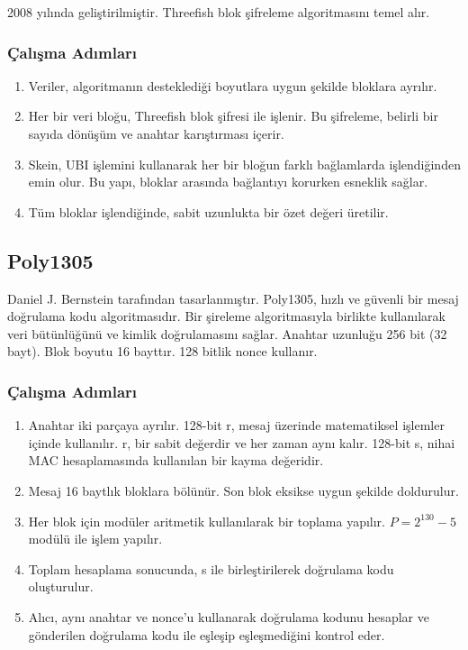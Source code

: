 2008 yılında geliştirilmiştir. Threefish blok şifreleme algoritmasını temel alır.

\subsubsection{Çalışma Adımları}

\begin{enumerate}
    \item Veriler, algoritmanın desteklediği boyutlara uygun şekilde bloklara ayrılır.
    \item Her bir veri bloğu, Threefish blok şifresi ile işlenir. Bu şifreleme, belirli bir sayıda dönüşüm ve anahtar karıştırması içerir.
    \item Skein, UBI işlemini kullanarak her bir bloğun farklı bağlamlarda işlendiğinden emin olur. Bu yapı, bloklar arasında bağlantıyı korurken esneklik sağlar.
    \item Tüm bloklar işlendiğinde, sabit uzunlukta bir özet değeri üretilir.
\end{enumerate}

\newpage

\subsection{Poly1305}

Daniel J. Bernstein tarafından tasarlanmıştır. Poly1305, hızlı ve güvenli bir mesaj doğrulama kodu algoritmasıdır. Bir şireleme algoritmasıyla birlikte kullanılarak veri bütünlüğünü ve kimlik doğrulamasını sağlar. Anahtar uzunluğu 256 bit (32 bayt). Blok boyutu 16 bayttır. 128 bitlik nonce kullanır.

\subsubsection{Çalışma Adımları}

\begin{enumerate}
    \item Anahtar iki parçaya ayrılır. 128-bit r, mesaj üzerinde matematiksel işlemler içinde kullanılır. r, bir sabit değerdir ve her zaman aynı kalır. 128-bit s, nihai MAC hesaplamasında kullanılan bir kayma değeridir.
    \item Mesaj 16 baytlık bloklara bölünür. Son blok eksikse uygun şekilde doldurulur.
    \item Her blok için modüler aritmetik kullanılarak bir toplama yapılır. $P = 2^{130} - 5$ modülü ile işlem yapılır.
    \item Toplam hesaplama sonucunda, s ile birleştirilerek doğrulama kodu oluşturulur.
    \item Alıcı, aynı anahtar ve nonce'u kullanarak doğrulama kodunu hesaplar ve gönderilen doğrulama kodu ile eşleşip eşleşmediğini kontrol eder.
\end{enumerate}

